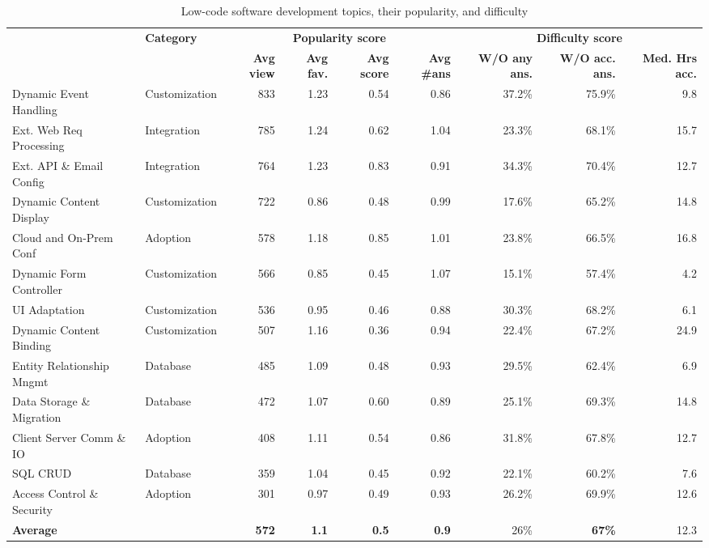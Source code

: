\begin{table}[t]
  \centering
   \caption{Low-code software development topics, their popularity, and difficulty}
    \begin{tabular}{llrrrrrrr}
    \toprule{}
    \multirow{2}{*}{\textbf{Topic}} & \multirow{2}{*}{\textbf{Category}} & \multicolumn{4}{c}{\textbf{Popularity score}} & \multicolumn{3}{c}{\textbf{Difficulty score}} \\
    \cmidrule{3-9}
    {} & {}  & \textbf{Avg view} & \textbf{Avg fav.} & \textbf{Avg score} & \textbf{Avg \#ans} & \textbf{W/O any ans.} & \textbf{W/O acc. ans.} & \textbf{Med. Hrs acc.} \\
    \midrule

   Dynamic Event Handling	&	Customization &	833 &	1.23 &	0.54 & 0.86	& 37.2\% & 75.9\% &	9.8 \\
   Ext. Web Req Processing & Integration & 785 &	1.24 &	0.62 & 1.04	& 23.3\% &	68.1\% &	15.7 \\ 
   Ext. API \& Email Config &		Integration &	764 &	1.23 &	0.83 &	0.91 &	34.3\% & 70.4\% &	12.7 \\
   Dynamic Content Display &	Customization 	& 722 &	0.86 & 0.48 & 0.99 &	17.6\%	& 65.2\%	& 14.8 \\
   Cloud and On-Prem Conf	&	Adoption &	578 &	1.18 &	0.85 & 1.01 &	23.8\% &	66.5\% &	16.8 \\  
   Dynamic Form Controller	&	Customization  &	566 &	0.85 &	0.45 & 1.07	& 15.1\% &	57.4\% &	4.2 \\
    UI Adaptation	&	Customization  &	536 &	0.95 & 	0.46 & 0.88 &	30.3\%	& 68.2\% &	6.1 \\ 
    Dynamic Content Binding	&	Customization &	507 &	1.16 &	0.36 & 0.94	& 22.4\% &	67.2\% &	24.9 \\
   Entity Relationship Mngmt	&	Database &	485  &	1.09 &	0.48 &	0.93 &	29.5\% & 62.4\% &	6.9 \\  
    Data Storage \& Migration	&	Database &	472 &	1.07 &	0.60 & 0.89 &	25.1\% &	69.3\% &	14.8 \\
    Client Server Comm \& IO	&	Adoption &	408	& 1.11 &	0.54 & 0.86	& 31.8\% &	67.8\% &	12.7 \\ 
    SQL CRUD	&	Database	& 359 &	1.04 &	0.45 & 0.92 &	22.1\%  &	60.2\% &	7.6 \\
   Access Control \& Security	&	Adoption &	301 &	0.97 &	0.49 & 0.93 &	26.2\% & 69.9\% &	12.6 \\
    \midrule
    \multicolumn{2}{l}{\textbf{Average}}  & \textbf{572} & \textbf{1.1} & \textbf{0.5} & \textbf{0.9} & 26\% &\textbf{67\%} & 12.3 \\
    \bottomrule
    \end{tabular}%
  \label{tab:topicPopularityDifficulty}%
\end{table}%

